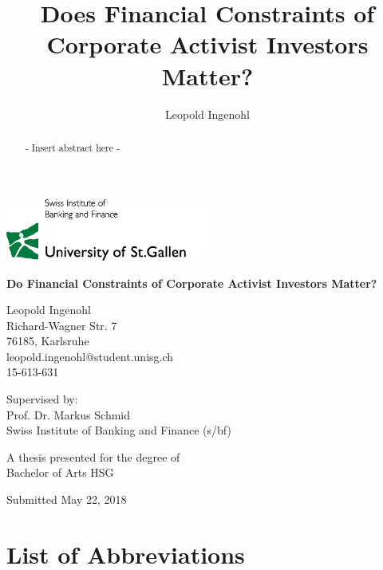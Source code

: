 \documentclass[12pt]{article}
\title{Does Financial Constraints of Corporate Activist Investors Matter?}
\author{Leopold Ingenohl}
\begin{document}
\begin{titlepage}
    \begin{center}
       
        \includegraphics[width=0.5\textwidth]{Logo.jpg}
       
        \vspace*{1.5cm}
		\huge
        \textbf{Do Financial Constraints of Corporate Activist Investors Matter?}

        \vspace{1.5cm}
		\normalsize
        Leopold Ingenohl\\
        Richard-Wagner Str. 7\\
        76185, Karlsruhe\\
        leopold.ingenohl@student.unisg.ch\\
        15-613-631

        \vspace{1.5cm}
        Supervised by:\\
        Prof. Dr. Markus Schmid\\
        Swiss Institute of Banking and Finance (s/bf)\\
        \vfill

        A thesis presented for the degree of\\
        Bachelor of Arts HSG

        \vspace{0.8cm}

        Submitted May 22, 2018

	\end{center}
	
\end{titlepage}

\cleardoublepage
{}
\begin{abstract}
	\centering
	- Insert abstract here -
\end{abstract}

\pagebreak

\tableofcontents
\listoftables
\listoffigures
\section*{List of Abbreviations}
\end{document}
